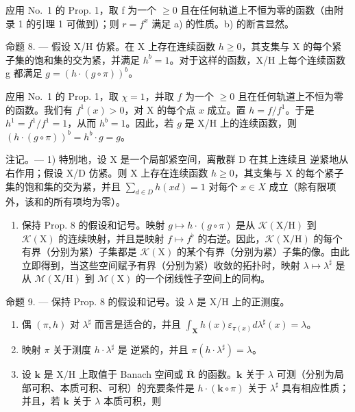 应用 No.~1 的 Prop. 1，取 f 为一个 \(\geqslant0\) 且在任何轨道上不恒为零的函数（由附录 1 的引理 1 可做到）；则 \(r = f^{x}\) 满足 a) 的性质。b) 的断言显然。

命题 8. --- 假设 X/H 仿紧。在 X 上存在连续函数 \(h \geqslant 0\)，其支集与 X 的每个紧子集的饱和集的交为紧，并满足 \(h^{b}=1\)。对于这样的函数，X/H 上每个连续函数 g 都满足 \(g=\left(h\cdot(g\circ\pi)\right)^{b}\)。

应用 No.~1 的 Prop. 1，取 \(\chi = 1\)，并取 \(f\) 为一个 \(\geqslant 0\) 且在任何轨道上不恒为零的函数。我们有 \(f^1(x) > 0\)，对 X 的每个点 \(x\) 成立。置 \(h = f / f^1\)。于是 \(h^1 = f^1 / f^1 = 1\)，从而 \(h^b = 1\)。因此，若 \(g\) 是 X/H 上的连续函数，则 \(\left(h \cdot (g \circ \pi)\right)^b = h^b \cdot g = g\)。

注记。--- 1) 特别地，设 X 是一个局部紧空间，离散群 D 在其上连续且 逆紧地从右作用；假设 X/D 仿紧。则 X 上存在连续函数 \(h \geqslant 0\)，其支集与 X 的每个紧子集的饱和集的交为紧，并且 \(\sum_{d \in D} h(x d) = 1\) 对每个 \(x \in X\) 成立（除有限项外，该和的所有项均为零）。

\begin{enumerate}
\def\labelenumi{\arabic{enumi})}
\setcounter{enumi}{1}
\tightlist
\item
  保持 Prop. 8 的假设和记号。映射 \(g \mapsto h \cdot (g \circ \pi)\) 是从 \(\mathcal{K}(\mathrm{X / H})\) 到 \(\mathcal{K}(\mathrm{X})\) 的连续映射，并且是映射 \(f \mapsto f^{\flat}\) 的右逆。因此，\(\mathcal{K}(\mathrm{X / H})\) 的每个有界（分别为紧）子集都是 \(\mathcal{K}(\mathrm{X})\) 的某个有界（分别为紧）子集的像。由此立即得到，当这些空间赋予有界（分别为紧）收敛的拓扑时，映射 \(\lambda \mapsto \lambda^{\sharp}\) 是从 \(\mathcal{M}(\mathrm{X / H})\) 到 \(\mathcal{M}(\mathrm{X})\) 的一个闭线性子空间上的同构。
\end{enumerate}

命题 9. --- 保持 Prop. 8 的假设和记号。设 \(\lambda\) 是 X/H 上的正测度。

\begin{enumerate}
\def\labelenumi{\alph{enumi})}
\item
  偶 \((\pi, h)\) 对 \(\lambda^{\sharp}\) 而言是适合的，并且 \(\int_{\mathbf{X}} h(x) \varepsilon_{\pi(x)} d\lambda^{\sharp}(x) = \lambda\)。
\item
  映射 \(\pi\) 关于测度 \(h\cdot \lambda^{\sharp}\) 是 逆紧的，并且 \(\pi (h\cdot \lambda^{\sharp}) = \lambda\)。
\item
  设 \(\mathbf{k}\) 是 \(\mathrm{X / H}\) 上取值于 Banach 空间或 \(\overline{\mathbf{R}}\) 的函数。\(\mathbf{k}\) 关于 \(\lambda\) 可测（分别为局部可积、本质可积、可积）的充要条件是 \(h\cdot (\mathbf{k}\circ \pi)\) 关于 \(\lambda^{\sharp}\) 具有相应性质；并且，若 \(\mathbf{k}\) 关于 \(\lambda\) 本质可积，则
\end{enumerate}

